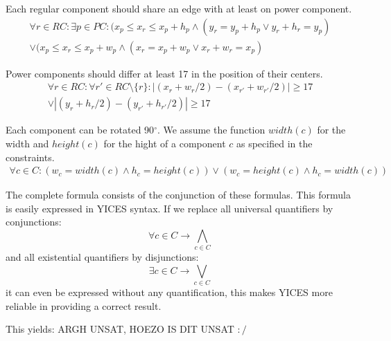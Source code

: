 \documentclass[12pt]{article}
\begin{document}
\vspace{3mm}

Each regular component should share an edge with at least on power component.
\begin{multline}
	\forall r \in RC : \exists p \in PC :
		(x_p \leq x_r \le x_p+h_p \wedge (y_r=y_p+h_p \vee y_r+h_r=y_p)  \\  
		\vee (x_p \leq x_r \le x_p+w_p \wedge (x_r=x_p+w_p \vee x_r+w_r=x_p)
\end{multline}

\vspace{3mm}

Power components should differ at least 17 in the position of their centers.
\begin{multline}
	\forall r \in RC : \forall r' \in RC \setminus \{r\} :
		|(x_r + w_r/2) - (x_{r'} + w_{r'}/2)| \geq 17 \\  
		\vee |(y_r + h_r/2) - (y_{r'} + h_{r'}/2)| \geq 17
\end{multline}

Each component can be rotated 90$^{\circ}$. We assume the function 
$width(c)$ for the width and $height(c)$ for the hight of a component $c$ as
specified in the constraints. 
\begin{multline}
	\forall c \in C : (w_c = width(c) \wedge h_c = height(c))
		\vee (w_c = height(c) \wedge h_c = width(c))
\end{multline}

The complete formula consists of the conjunction of these formulas. This
formula is easily expressed in YICES syntax. If we replace all universal
quantifiers by conjunctions:
\begin{equation}
	\forall c \in C \rightarrow \bigwedge_{c \in C}
\end{equation}
and all existential quantifiers by disjunctions:
\begin{equation}
	\exists c \in C \rightarrow \bigvee_{c \in C}
\end{equation}
it can even be expressed without any quantification, this makes YICES more
reliable in providing a correct result.

This yields: ARGH UNSAT, HOEZO IS DIT UNSAT $:/$
\end{document}
